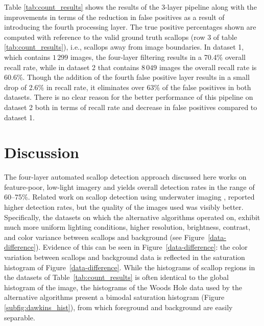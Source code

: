 \documentclass {udthesis}
\begin{document}
Table \ref{tab:count_results} shows the results of the 3-layer pipeline along with the improvements in terms of the reduction in false positives as a result of introducing the fourth processing layer. 
The true positive percentages shown are computed with reference to the valid ground truth scallops (row 3 of table \ref{tab:count_results}), i.e., scallops away from image boundaries.  
In dataset 1, which contains $1\,299$ images, the four-layer filtering results in a 70.4\% overall recall rate, while in dataset 2 that contains $8\,049$ images the overall recall rate is 60.6\%.  Though the addition of the fourth false positive layer results in a small drop of 2.6\% in recall rate, it eliminates over 63\% of the false positives in both datasets.
There is no clear reason for the better performance of this pipeline on dataset 2 both in terms of recall rate and decrease in false positives compared to dataset 1.

\section{Discussion}
\label{sec:scallop_discussion}

The four-layer automated scallop detection approach discussed
here works on feature-poor, low-light imagery and yields
overall detection rates in the range of 60--75\%. 
Related work on scallop detection using underwater imaging \cite{dawkins11,dawkings13},
reported higher detection rates, but the quality of the images used was visibly better.  Specifically,
the datasets on which the 
alternative algorithms \cite{dawkings13}
operated on, exhibit much more uniform lighting conditions, higher resolution,
brightness, contrast, and color variance between scallops and background 
(see Figure~\ref{data-difference}). 
Evidence of this can be seen in Figure~\ref{data-difference}: the color variation between scallops and background data is reflected in the
saturation histogram of Figure~\ref{data-difference}. While the histograms
of scallop regions in the datasets of Table~\ref{tab:count_results} is often 
identical to the global histogram of the image, the histograms of the Woods Hole data used by the alternative algorithms \cite{dawkings13} present a bimodal saturation histogram
(Figure \ref{subfig:dawkins_hist}), from which 
foreground and background are easily separable.
\end{document}

